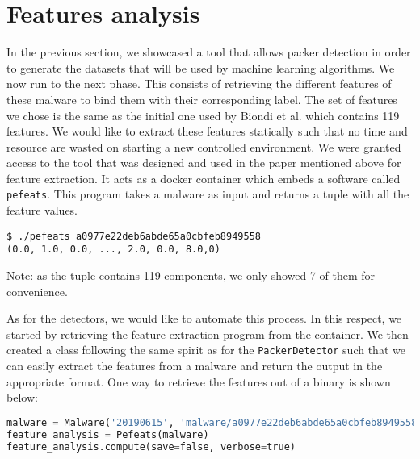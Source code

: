 \section{Features analysis}
In the previous section, we showcased a tool that allows packer detection in order to generate the datasets that will be used by  machine learning algorithms. We now run to the next phase. This consists of retrieving the different features of these malware to bind them with their corresponding label. The set of features we chose is the same as the initial one used by Biondi et al. \cite{biondi_effective_2019} which contains 119 features. We would like to extract these features statically such that no time and resource are wasted on starting a new controlled environment. We were granted access to the tool that was designed and used in the paper mentioned above for feature extraction. It acts as a docker container which embeds a software called \texttt{pefeats}. This program takes a malware as input and returns a tuple with all the feature values. 

\begin{lstlisting}
$ ./pefeats a0977e22deb6abde65a0cbfeb8949558
(0.0, 1.0, 0.0, ..., 2.0, 0.0, 8.0,0)
\end{lstlisting}
Note: as the tuple contains 119 components, we only showed 7 of them for convenience.

As for the detectors, we would like to automate this process. In this respect, we started by retrieving the feature extraction program from the container. We then created a class following the same spirit as for the \texttt{PackerDetector} such that we can easily extract the features from a malware and return the output in the appropriate format. One way to retrieve the features out of a binary is shown below:

\begin{lstlisting}[language=python]
malware = Malware('20190615', 'malware/a0977e22deb6abde65a0cbfeb8949558')
feature_analysis = Pefeats(malware)
feature_analysis.compute(save=false, verbose=true)
\end{lstlisting}